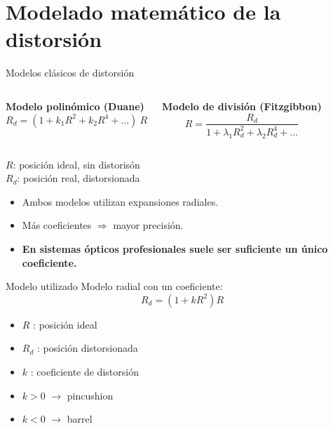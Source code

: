 \documentclass[aspectratio=169]{beamer}
\begin{document}
\section{Modelado matemático de la distorsión}
\begin{frame}{Modelos clásicos de distorsión}

\small
\begin{columns}[T,onlytextwidth]

\centering
\textbf{Modelo polinómico (Duane)}
\vspace{0.3cm}
\[
R_d = (1 + k_1 R^2 + k_2 R^4 + \dots)\ R
\]


\centering
\textbf{Modelo de división (Fitzgibbon)}
\vspace{0.25cm}
\[
R = \dfrac{R_d}{1 + \lambda_1 R_d^2 + \lambda_2 R_d^4 + \dots}
\]

\end{columns}
\vspace{0.4cm}
\scriptsize
$R$: posición ideal, sin distorisón\\
$R_d$: posición real, distorsionada
\vspace{0.6cm}

\begin{itemize}
    \item Ambos modelos utilizan expansiones radiales.
    \item Más coeficientes $\Rightarrow$ mayor precisión.
    \item \alert{\textbf{En sistemas ópticos profesionales suele ser suficiente un único coeficiente.}}
\end{itemize}

\end{frame}
\begin{frame}{Modelo utilizado}
Modelo radial con un coeficiente:
\begin{equation*}
    R_d = (1 + kR^2)R
\end{equation*}

\begin{itemize}
    \item $R$ : posición ideal
    \item $R_d$ : posición distorsionada
    \item $k$ : coeficiente de distorsión
\end{itemize}

\begin{itemize}
    \item $k > 0$ $\rightarrow$ pincushion
    \item $k < 0$ $\rightarrow$ barrel
\end{itemize}
\end{frame}
\end{document}

